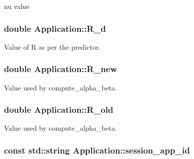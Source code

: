 nu value 

\hypertarget{classApplication_a374d43f68ae27aaed98278e8152a434c}{
\subsubsection[{R\-\_\-d}]{\setlength{\rightskip}{0pt plus 5cm}double Application\-::\-R\-\_\-d\hspace{0.3cm}{\ttfamily [private]}}}\label{classApplication_a374d43f68ae27aaed98278e8152a434c}


Value of R as per the predictor. 

\hypertarget{classApplication_a9e94824741ac0c52d0fa5ede30c72fa1}{
\subsubsection[{R\-\_\-new}]{\setlength{\rightskip}{0pt plus 5cm}double Application\-::\-R\-\_\-new\hspace{0.3cm}{\ttfamily [private]}}}\label{classApplication_a9e94824741ac0c52d0fa5ede30c72fa1}


Value used by compute\-\_\-alpha\-\_\-beta. 

\hypertarget{classApplication_a950cfc8da4a8e4640aee8d2840f53e0e}{
\subsubsection[{R\-\_\-old}]{\setlength{\rightskip}{0pt plus 5cm}double Application\-::\-R\-\_\-old\hspace{0.3cm}{\ttfamily [private]}}}\label{classApplication_a950cfc8da4a8e4640aee8d2840f53e0e}


Value used by compute\-\_\-alpha\-\_\-beta. 

\hypertarget{classApplication_a6152c40564d526b9b60871c98f7a51c7}{
\subsubsection[{session\-\_\-app\-\_\-id}]{\setlength{\rightskip}{0pt plus 5cm}const std\-::string Application\-::session\-\_\-app\-\_\-id\hspace{0.3cm}{\ttfamily [private]}}}\label{classApplication_a6152c40564d526b9b60871c98f7a51c7}


